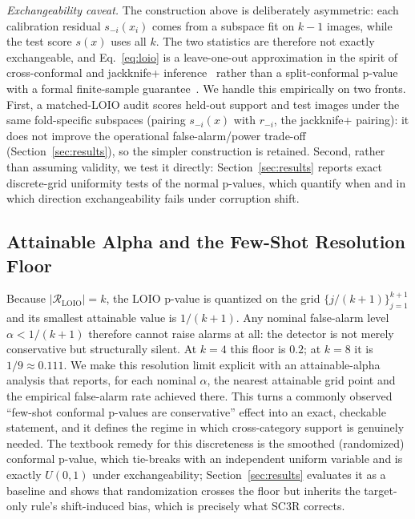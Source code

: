 \emph{Exchangeability caveat.} The construction above is deliberately asymmetric: each calibration residual $s_{-i}(x_i)$ comes from a subspace fit on $k{-}1$ images, while the test score $s(x)$ uses all $k$. The two statistics are therefore not exactly exchangeable, and Eq.~\eqref{eq:loio} is a leave-one-out approximation in the spirit of cross-conformal and jackknife+ inference~\cite{vovk2005,barber2021jackknife,hennhofer2024loio} rather than a split-conformal p-value with a formal finite-sample guarantee~\cite{bates2023testing,laxhammar2015inductive}. We handle this empirically on two fronts. First, a matched-LOIO audit scores held-out support and test images under the same fold-specific subspaces (pairing $s_{-i}(x)$ with $r_{-i}$, the jackknife+ pairing): it does not improve the operational false-alarm/power trade-off (Section~\ref{sec:results}), so the simpler construction is retained. Second, rather than assuming validity, we test it directly: Section~\ref{sec:results} reports exact discrete-grid uniformity tests of the normal p-values, which quantify when and in which direction exchangeability fails under corruption shift.

\subsection{Attainable Alpha and the Few-Shot Resolution Floor}
Because $|\mathcal{R}_{\mathrm{LOIO}}|=k$, the LOIO p-value is quantized on the grid $\{j/(k{+}1)\}_{j=1}^{k+1}$ and its smallest attainable value is $1/(k{+}1)$. Any nominal false-alarm level $\alpha<1/(k{+}1)$ therefore cannot raise alarms at all: the detector is not merely conservative but structurally silent. At $k{=}4$ this floor is $0.2$; at $k{=}8$ it is $1/9\approx0.111$. We make this resolution limit explicit with an attainable-alpha analysis that reports, for each nominal $\alpha$, the nearest attainable grid point and the empirical false-alarm rate achieved there. This turns a commonly observed ``few-shot conformal p-values are conservative'' effect into an exact, checkable statement, and it defines the regime in which cross-category support is genuinely needed. The textbook remedy for this discreteness is the smoothed (randomized) conformal p-value, which tie-breaks with an independent uniform variable and is exactly $U(0,1)$ under exchangeability; Section~\ref{sec:results} evaluates it as a baseline and shows that randomization crosses the floor but inherits the target-only rule's shift-induced bias, which is precisely what SC3R corrects.

